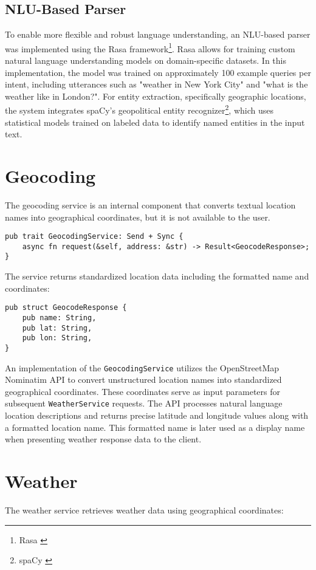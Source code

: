 \subsection{NLU-Based Parser}
To enable more flexible and robust language understanding,
an NLU-based parser was implemented using the Rasa framework\footnote{Rasa \cite{rasa}}.
Rasa allows for training custom natural language understanding models on domain-specific datasets.
In this implementation, the model was trained on approximately 100 example queries per intent,
including utterances such as "weather in New York City" and "what is the weather like in London?".
For entity extraction, specifically geographic locations,
the system integrates spaCy's geopolitical entity recognizer\footnote{spaCy \cite{spacy}},
which uses statistical models trained on labeled data to identify named entities in the input text.

\section{Geocoding}
The geocoding service is an internal component that converts textual location names into geographical coordinates, but it is not available to the user.

\begin{verbatim}
pub trait GeocodingService: Send + Sync {
    async fn request(&self, address: &str) -> Result<GeocodeResponse>;
}
\end{verbatim}

The service returns standardized location data including the formatted name and coordinates:

\begin{verbatim}
pub struct GeocodeResponse {
    pub name: String,
    pub lat: String,
    pub lon: String,
}
\end{verbatim}

An implementation of the \texttt{GeocodingService} utilizes the OpenStreetMap Nominatim API
to convert unstructured location names into standardized geographical coordinates.
These coordinates serve as input parameters for subsequent \texttt{WeatherService} requests.
The API processes natural language location descriptions and returns precise latitude and longitude values along with a formatted location name.
This formatted name is later used as a display name when presenting weather response data to the client.

\section{Weather}
The weather service retrieves weather data using geographical coordinates:

